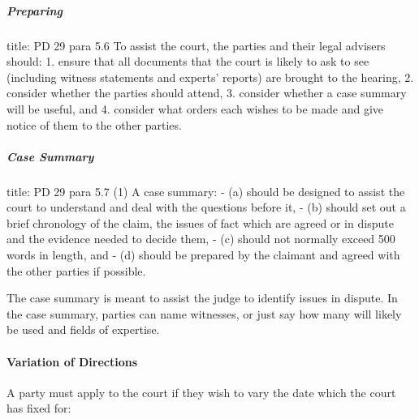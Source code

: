 \documentclass[
]{article}
\newenvironment{Shaded}{}{}
\newcommand{\NormalTok}[1]{#1}
\begin{document}
\hypertarget{preparing}{%
\subparagraph{Preparing}\label{preparing}}

\begin{Shaded}
\begin{Highlighting}[]
\NormalTok{title: PD 29 para 5.6}
\NormalTok{To assist the court, the parties and their legal advisers should:}
\NormalTok{1. ensure that all documents that the court is likely to ask to see (including witness statements and experts’ reports) are brought to the hearing,}
\NormalTok{2. consider whether the parties should attend,}
\NormalTok{3. consider whether a case summary will be useful, and}
\NormalTok{4. consider what orders each wishes to be made and give notice of them to the other parties.}
\end{Highlighting}
\end{Shaded}

\hypertarget{case-summary}{%
\subparagraph{Case Summary}\label{case-summary}}

\begin{Shaded}
\begin{Highlighting}[]
\NormalTok{title: PD 29 para 5.7}
\NormalTok{(1) A case summary:}
\NormalTok{{-} (a) should be designed to assist the court to understand and deal with the questions before it,}
\NormalTok{{-} (b) should set out a brief chronology of the claim, the issues of fact which are agreed or in dispute and the evidence needed to decide them,}
\NormalTok{{-} (c) should not normally exceed 500 words in length, and}
\NormalTok{{-} (d) should be prepared by the claimant and agreed with the other parties if possible.}
\end{Highlighting}
\end{Shaded}

The case summary is meant to assist the judge to identify issues in
dispute. In the case summary, parties can name witnesses, or just say
how many will likely be used and fields of expertise.

\hypertarget{variation-of-directions}{%
\paragraph{Variation of Directions}\label{variation-of-directions}}

A party must apply to the court if they wish to vary the date which the
court has fixed for:
\end{document}
